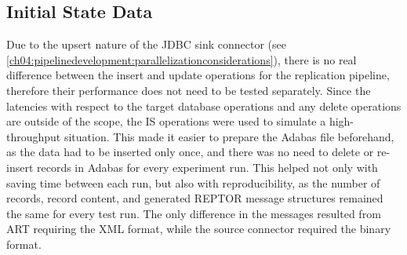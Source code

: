 \subsection{Initial State Data}
Due to the upsert nature of the \ac{JDBC} sink connector (see \ref{ch04:pipelinedevelopment:parallelizationconsiderations}), there is no real difference between the insert and update operations for the replication pipeline, therefore their performance does not need to be tested separately. Since the latencies with respect to the target database operations and any delete operations are outside of the scope, the \ac{IS} operations were used to simulate a high-throughput situation. This made it easier to prepare the Adabas file beforehand, as the data had to be inserted only once, and there was no need to delete or re-insert records in Adabas for every experiment run. This helped not only with saving time between each run, but also with reproducibility, as the number of records, record content, and generated \ac{REPTOR} message structures remained the same for every test run. The only difference in the messages resulted from \ac{ART} requiring the XML format, while the source connector required the binary format.

